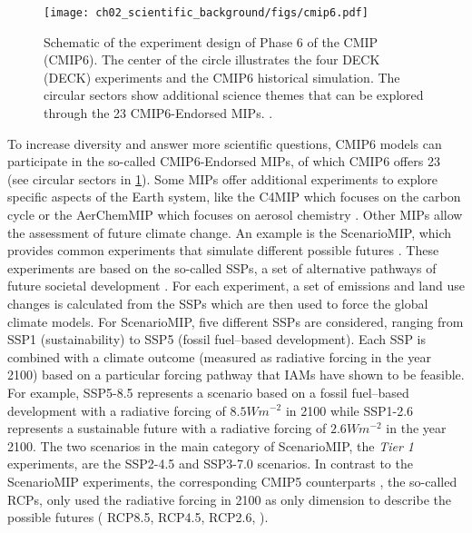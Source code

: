\begin{figure}[t]
  \centering
  \texttt{[image: 
    ch02\_scientific\_background/figs/cmip6.pdf]}
  \caption[
    Schematic of the experiment design of Phase 6 of the \acl{CMIP}
    (\acs{CMIP}6).
  ]{
    Schematic of the experiment design of Phase 6 of the \acl{CMIP}
    (\acs{CMIP}6). The center of the circle illustrates the four \acs{DECK}
    (\acl{DECK}) experiments and the \acs{CMIP}6 historical simulation. The
    circular sectors show additional science themes that can be explored
    through the 23 \acs{CMIP}6-Endorsed \acfp{MIP}.
    .
  }
  \label{fig:02:cmip6}
\end{figure}

To increase diversity and answer more scientific questions, \acs{CMIP}6 models
can participate in the so-called \acs{CMIP}6-Endorsed \acp{MIP}, of which
\acs{CMIP}6 offers 23 (see circular sectors in \cref{fig:02:cmip6}). Some
\acp{MIP} offer additional experiments to explore specific aspects of the Earth
system, like the \ac{C4MIP} which focuses on the carbon cycle
\autocite{Jones2016} or the \ac{AerChemMIP} which focuses on aerosol chemistry
\autocite{Collins2017}. Other \acp{MIP} allow the assessment of future climate
change. An example is the \ac{ScenarioMIP}, which provides common experiments
that simulate different possible futures \autocite{ONeill2016}. These
experiments are based on the so-called \acp{SSP}, a set of alternative pathways
of future societal development \autocite{ONeill2013, ONeill2017}. For each
experiment, a set of emissions and land use changes is calculated from the
\acp{SSP} \autocite{Riahi2017} which are then used to force the global climate
models. For \ac{ScenarioMIP}, five different \acp{SSP} are considered, ranging
from \acs{SSP}1 (sustainability) to \acs{SSP}5 (fossil fuel--based
development). Each \ac{SSP} is combined with a climate outcome (measured as
radiative forcing in the year 2100) based on a particular forcing pathway that
\acp{IAM} have shown to be feasible. For example, \acs{SSP}5-8.5 represents a
scenario based on a fossil fuel--based development with a radiative forcing of
$8.5 \unit{W m^{-2}}$ in 2100 while \acs{SSP}1-2.6 represents a sustainable
future with a radiative forcing of $2.6 \unit{W m^{-2}}$ in the year 2100. The
two scenarios in the main category of \ac{ScenarioMIP}, the \emph{Tier 1}
experiments, are the \acs{SSP}2-4.5 and \acs{SSP}3-7.0 scenarios. In contrast
to the \ac{ScenarioMIP} experiments, the corresponding \acs{CMIP}5 counterparts
\autocite{Taylor2012}, the so-called \acp{RCP}, only used the radiative forcing
in 2100 as only dimension to describe the possible futures (\eg{} \acs{RCP}8.5,
\acs{RCP}4.5, \acs{RCP}2.6, \etc{}).

